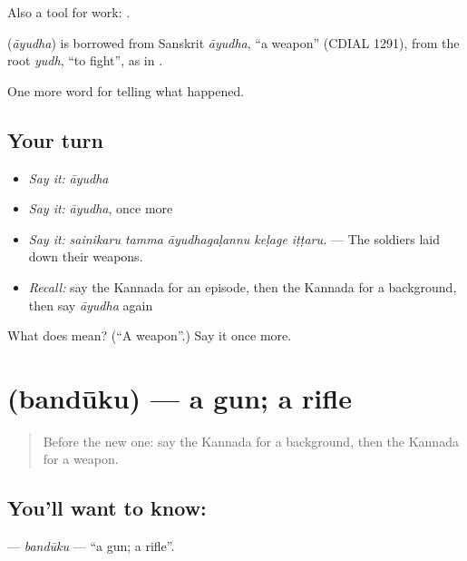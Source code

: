 Also a tool for work:  .

\begin{cousinweb}
\textbf{} (\emph{āyudha}) is borrowed from Sanskrit \emph{āyudha}, \textquotedblleft{}a weapon\textquotedblright{} (CDIAL 1291), from the root \emph{yudh}, \textquotedblleft{}to fight\textquotedblright{}, as in .
\end{cousinweb}

\begin{grammarlens}[title={What you've built}]
One more word for telling what happened.
\end{grammarlens}

\subsection*{Your turn}
\begin{itemize}
\raggedright
  \item \emph{Say it:} \emph{āyudha}
  \item \emph{Say it:} \emph{āyudha}, once more
  \item \emph{Say it:} \emph{sainikaru tamma āyudhagaḷannu keḷage iṭṭaru.} — The soldiers laid down their weapons.
  \item \emph{Recall:} say the Kannada for an episode, then the Kannada for a background, then say \emph{āyudha} again
\end{itemize}

\begin{tcolorbox}[breakable,colback=teal!4,colframe=teal!35!black,title={Before you move on}]
What does  mean? (\textquotedblleft{}A weapon\textquotedblright{}.) Say it once more.
\end{tcolorbox}
\section[\texorpdfstring{\kn{ಬಂದೂಕು} (bandūku)}{ಬಂದೂಕು (bandūku)}]{ (bandūku) — a gun; a rifle}

\label{lesson:KA-C344-banduku}



\begin{quote}
Before the new one: say the Kannada for a background, then the Kannada for a weapon.
\end{quote}

\subsection*{You'll want to know: }
\textbf{} — \emph{bandūku} — \textquotedblleft{}a gun; a rifle\textquotedblright{}.


